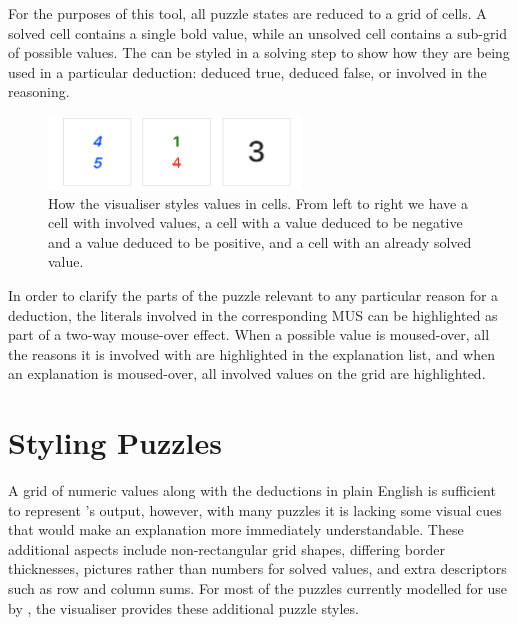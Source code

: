 \documentclass[10pt]{article}
\begin{document}
For the purposes of this tool, all puzzle states are reduced to a grid of cells. A solved cell contains a single bold value, while an unsolved cell contains a sub-grid of possible values. The can be styled in a solving step to show how they are being used in a particular deduction: deduced true, deduced false, or involved in the reasoning. 
\begin{figure}[h]
    \begin{center}
    	\includegraphics[width=0.6\textwidth]{visualiser2}
    \end{center}
    \caption{How the visualiser styles values in cells. From left to right we have a cell with involved values, a cell with a value deduced to be negative and a value deduced to be positive, and a cell with an already solved value.}
\end{figure}

In order to clarify the parts of the puzzle relevant to any particular reason for a deduction, the literals involved in the corresponding MUS can be highlighted as part of a two-way mouse-over effect. When a possible value is moused-over, all the reasons it is involved with are highlighted in the explanation list, and when an explanation is moused-over, all involved values on the grid are highlighted.

\section{Styling Puzzles}
A grid of numeric values along with the deductions in plain English is sufficient to represent \demystify's output, however, with many puzzles it is lacking some visual cues that would make an explanation more immediately understandable. These additional aspects include non-rectangular grid shapes, differing border thicknesses, pictures rather than numbers for solved values, and extra descriptors such as row and column sums. For most of the puzzles currently modelled for use by \demystify, the visualiser provides these additional puzzle styles. 
\end{document}
